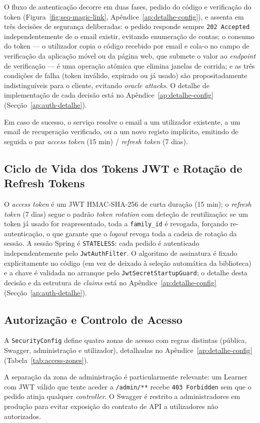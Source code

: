 O fluxo de autenticação decorre em duas fases, pedido do código e verificação do token (Figura~\ref{fig:seq-magic-link}, Apêndice~\ref{ap:detalhe-config}), e assenta em três decisões de segurança deliberadas: o pedido responde sempre \texttt{202 Accepted} independentemente de o email existir, evitando enumeração de contas; o consumo do token --- o utilizador copia o código recebido por email e cola-o no campo de verificação da aplicação móvel ou da página web, que submete o valor ao \textit{endpoint} de verificação --- é uma operação atómica que elimina janelas de corrida; e as três condições de falha (token inválido, expirado ou já usado) são propositadamente indistinguíveis para o cliente, evitando \textit{oracle attacks}. O detalhe de implementação de cada decisão está no Apêndice~\ref{ap:detalhe-config} (Secção~\ref{ap:auth-detalhe}).

Em caso de sucesso, o serviço resolve o email a um utilizador existente, a um email de recuperação verificado, ou a um novo registo implícito, emitindo de seguida o par \textit{access token} (15 min) / \textit{refresh token} (7 dias).

\subsection{Ciclo de Vida dos Tokens JWT e Rotação de Refresh Tokens} \label{sec:token-lifecycle}

O \textit{access token} é um JWT HMAC-SHA-256 de curta duração (15 min); o \textit{refresh token} (7 dias) segue o padrão \textit{token rotation} com deteção de reutilização: se um token já usado for reapresentado, toda a \texttt{family\_id} é revogada, forçando re-autenticação, o que garante que o \textit{logout} revoga toda a cadeia de rotação da sessão. A sessão Spring é \texttt{STATELESS}: cada pedido é autenticado independentemente pelo \texttt{JwtAuthFilter}. O algoritmo de assinatura é fixado explicitamente no código (em vez de deixado à seleção automática da biblioteca) e a chave é validada no arranque pelo \texttt{JwtSecretStartupGuard}; o detalhe desta decisão e da estrutura de \textit{claims} está no Apêndice~\ref{ap:detalhe-config} (Secção~\ref{ap:auth-detalhe}).

\subsection{Autorização e Controlo de Acesso} \label{sec:authz}

A \texttt{SecurityConfig} define quatro zonas de acesso com regras distintas (pública, Swagger, administração e utilizador), detalhadas no Apêndice~\ref{ap:detalhe-config} (Tabela~\ref{tab:access-zones}).

A separação da zona de administração é particularmente relevante: um Learner com JWT válido que tente aceder a \texttt{/admin/**} recebe \texttt{403 Forbidden} sem que o pedido atinja qualquer \textit{controller}.
O Swagger é restrito a administradores em produção para evitar exposição do contrato de API a utilizadores não autorizados.
